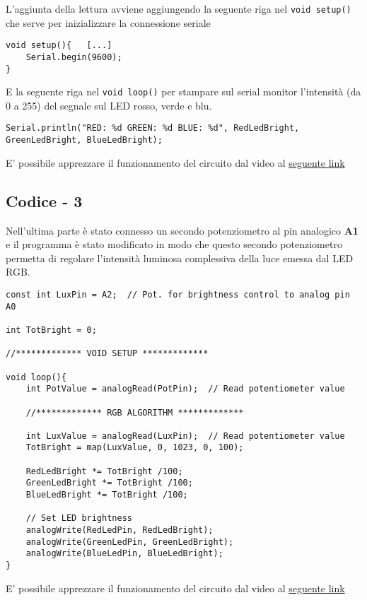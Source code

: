 \clearpage
L'aggiunta della lettura avviene aggiungendo la seguente riga nel \texttt{void setup()} che serve per inizializzare la connessione seriale
\begin{lstlisting}[frame=single, language=Arduino]
void setup(){   [...]
    Serial.begin(9600);
}
\end{lstlisting}
E la seguente riga nel \texttt{void loop()} per stampare sul serial monitor l'intensità (da 0 a 255) del segnale sul LED rosso, verde e blu.
\begin{lstlisting}[frame=single, language=Arduino]
Serial.println("RED: %d GREEN: %d BLUE: %d", RedLedBright, GreenLedBright, BlueLedBright); 
\end{lstlisting}
E' possibile apprezzare il funzionamento del circuito dal video al \href{https://mediaspace.unipd.it/media/Esperimento+2/1_y2jgm47p}{seguente link}
\subsection{Codice - 3}
Nell'ultima parte è stato connesso un secondo potenziometro al pin analogico \textbf{A1} e il programma è stato modificato in modo che questo secondo potenziometro permetta di regolare l’intensità luminosa complessiva della luce emessa dal LED RGB.
\begin{lstlisting}[frame=single, language=Arduino]
const int LuxPin = A2;  // Pot. for brightness control to analog pin A0 

int TotBright = 0;

//************* VOID SETUP *************

void loop(){
    int PotValue = analogRead(PotPin);  // Read potentiometer value

    //************* RGB ALGORITHM *************
    
    int LuxValue = analogRead(LuxPin);  // Read potentiometer value
    TotBright = map(LuxValue, 0, 1023, 0, 100);

    RedLedBright *= TotBright /100;
    GreenLedBright *= TotBright /100;
    BlueLedBright *= TotBright /100;

    // Set LED brightness
    analogWrite(RedLedPin, RedLedBright); 
    analogWrite(GreenLedPin, GreenLedBright);
    analogWrite(BlueLedPin, BlueLedBright);  
}
\end{lstlisting}
E' possibile apprezzare il funzionamento del circuito dal video al \href{https://mediaspace.unipd.it/media/Esperimento+2.1/1_ewlxzlyv}{seguente link}
